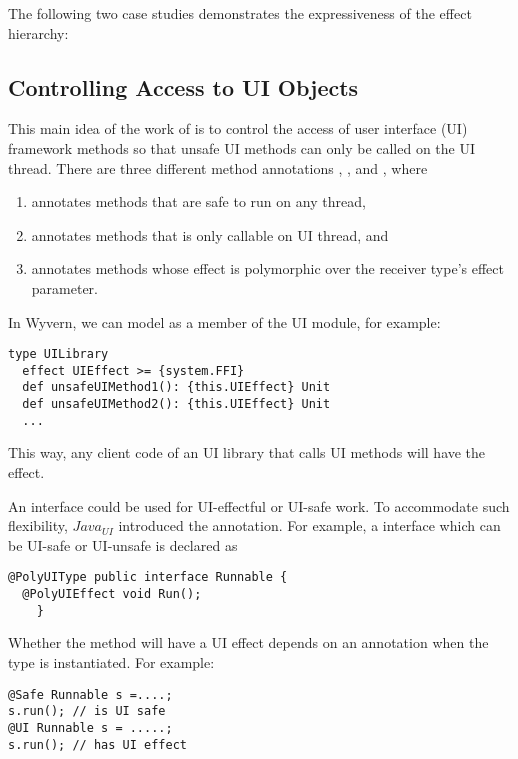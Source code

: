 The following two case studies  demonstrates the expressiveness of the effect hierarchy:

\subsection{Controlling Access to UI Objects}

This main idea of the work of \cite{gordon13} is to control the access of user interface (UI) framework methods so that unsafe UI methods can only be called on the UI thread. There are three different method annotations , , and , where
\begin{enumerate}
    \item {} annotates methods that are safe to run on any thread,
    \item {} annotates methods that is only callable on UI thread, and
    \item {} annotates methods whose effect is polymorphic over the receiver type's effect parameter.
\end{enumerate}

In Wyvern, we can model  as a member of the UI module, for example:
\begin{lstlisting}[numbers=none]
type UILibrary
  effect UIEffect >= {system.FFI}
  def unsafeUIMethod1(): {this.UIEffect} Unit
  def unsafeUIMethod2(): {this.UIEffect} Unit
  ...
\end{lstlisting}
This way, any client code of an UI library that calls UI methods will have the  effect.

An interface could be used for UI-effectful or UI-safe work. To accommodate such flexibility, $\mathit{Java}_{\mathit{UI}}$ introduced the  annotation. For example, a  interface which can be UI-safe or UI-unsafe is declared as
\begin{lstlisting}[numbers=none]
@PolyUIType public interface Runnable {
  @PolyUIEffect void Run();
    }
\end{lstlisting}

Whether the method  will have a UI effect depends on an annotation when the type is instantiated. For example:
\begin{lstlisting}[numbers=none]
@Safe Runnable s =....;
s.run(); // is UI safe
@UI Runnable s = .....;
s.run(); // has UI effect
\end{lstlisting}


